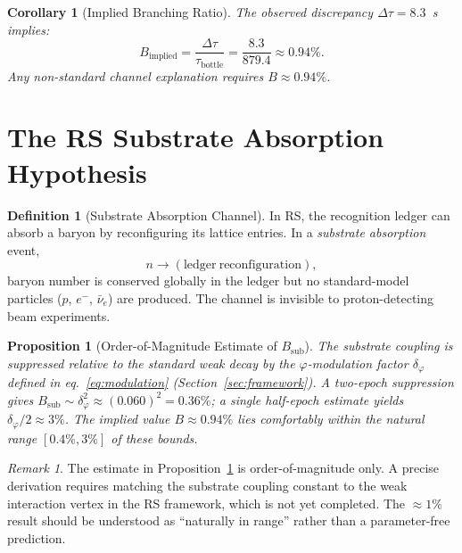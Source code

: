 \documentclass[12pt,a4paper]{article}
\newtheorem{corollary}[theorem]{Corollary}
\newtheorem{proposition}[theorem]{Proposition}
\theoremstyle{definition}
\newtheorem{definition}[theorem]{Definition}
\theoremstyle{remark}
\newtheorem{remark}[theorem]{Remark}
\begin{document}
\begin{corollary}[Implied Branching Ratio]
The observed discrepancy $\Delta\tau = 8.3$~s implies:
\begin{equation}
  B_{\mathrm{implied}} = \frac{\Delta\tau}{\tau_{\mathrm{bottle}}}
  = \frac{8.3}{879.4} \approx 0.94\%.
\end{equation}
Any non-standard channel explanation requires $B \approx 0.94\%$.
\end{corollary}

\section{The RS Substrate Absorption Hypothesis}
\label{sec:rs}

\begin{definition}[Substrate Absorption Channel]
\label{def:sub}
In RS, the recognition ledger can absorb a baryon by reconfiguring its
lattice entries.  In a \emph{substrate absorption} event,
\begin{equation}
  n \to \mathrm{(ledger\ reconfiguration)},
\end{equation}
baryon number is conserved globally in the ledger but no standard-model
particles ($p$, $e^-$, $\bar\nu_e$) are produced.  The channel is
invisible to proton-detecting beam experiments.
\end{definition}

\begin{proposition}[Order-of-Magnitude Estimate of $B_{\mathrm{sub}}$]
\label{prop:estimate}
The substrate coupling is suppressed relative to the standard weak
decay by the $\varphi$-modulation factor $\delta_\varphi$ defined in
eq.~\eqref{eq:modulation} (Section~\ref{sec:framework}).
A two-epoch suppression gives $B_{\mathrm{sub}} \sim \delta_\varphi^2
\approx (0.060)^2 = 0.36\%$; a single half-epoch estimate yields
$\delta_\varphi/2 \approx 3\%$.  The implied value $B \approx 0.94\%$
lies comfortably within the natural range $[0.4\%, 3\%]$ of these bounds.
\end{proposition}

\begin{remark}
The estimate in Proposition~\ref{prop:estimate} is order-of-magnitude
only.  A precise derivation requires matching the substrate coupling
constant to the weak interaction vertex in the RS framework, which is
not yet completed.  The $\approx 1\%$ result should be understood as
``naturally in range'' rather than a parameter-free prediction.
\end{remark}
\end{document}
